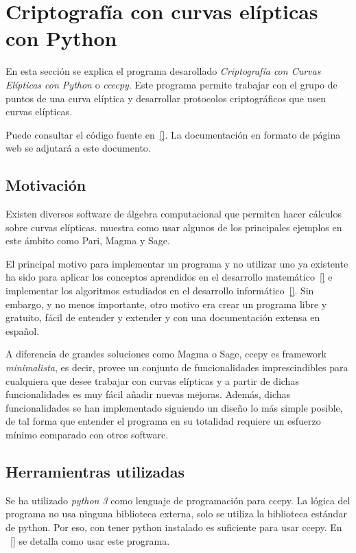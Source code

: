 \section{Criptografía con curvas elípticas con Python}
\label{sec:Criptografía con curvas elípticas con Python}

En esta sección se explica el programa desarollado \emph{Criptografía con Curvas Elípticas con Python} o \emph{ccecpy}. Este programa permite trabajar con el grupo de puntos de una curva elíptica y desarrollar protocolos criptográficos que usen curvas elípticas.

Puede consultar el código fuente en~\ref{}. La documentación en formato de página web se adjutará a este documento.

\subsection{Motivación}
\label{sub:Motivación}

Existen diversos software de álgebra computacional que permiten hacer cálculos sobre curvas elípticas. \cite{Washington:2008} muestra como usar algunos de los principales ejemplos en este ámbito como Pari, Magma y Sage.

El principal motivo para implementar un programa y no utilizar uno ya existente ha sido para aplicar los conceptos aprendidos en el desarrollo matemático~\ref{} e implementar los algoritmos estudiados en el desarrollo informático~\ref{}. Sin embargo, y no menos importante, otro motivo era crear un programa libre y gratuito,
fácil de entender y extender y con una documentación extensa en español.

A diferencia de grandes soluciones como Magma o Sage, ccepy es framework \emph{minimalista}, es decir, provee un conjunto de funcionalidades imprescindibles para cualquiera que desee trabajar con curvas elípticas y a partir de dichas funcionalidades es muy fácil añadir nuevas mejoras. Además, dichas funcionalidades se han implementado siguiendo un diseño lo más simple posible, de tal forma que entender el programa en su totalidad requiere un esfuerzo mínimo comparado con otros software.

\subsection{Herramientras utilizadas}
\label{sub:Herramientras utilizadas}

Se ha utilizado \emph{python 3} como lenguaje de programación para ccepy. La lógica del programa no usa ninguna biblioteca externa, solo se utiliza la biblioteca estándar de python. Por eso, con tener python instalado es suficiente para usar ccepy. En ~\ref{} se detalla como usar este programa.

